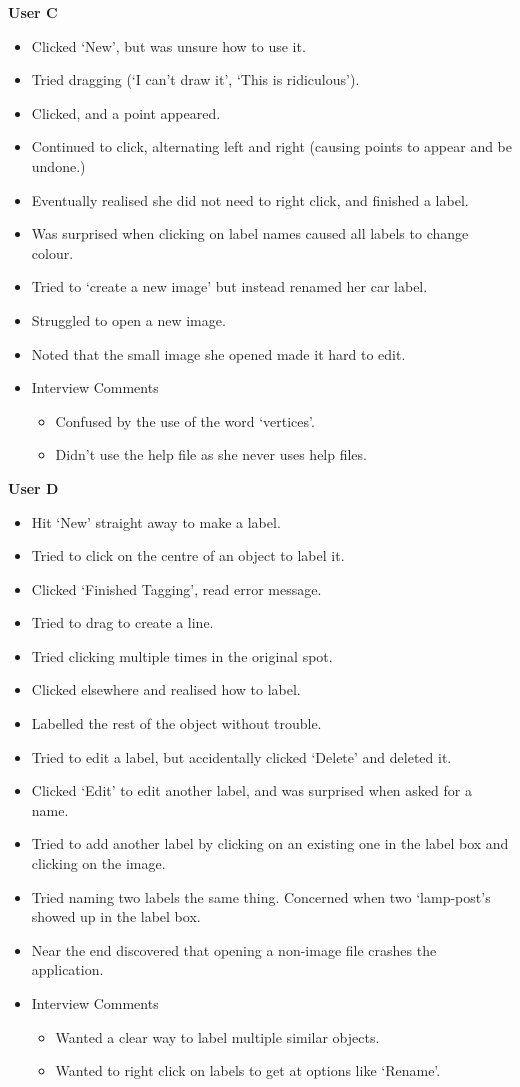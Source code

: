 \documentclass[11pt,twocolumn]{article}
\begin{document}
\textbf{User C}
\begin{itemize}
\item Clicked `New', but was unsure how to use it.
\item Tried dragging (`I can't draw it', `This is ridiculous').
\item Clicked, and a point appeared.
\item Continued to click, alternating left and right (causing points to appear and be undone.)
\item Eventually realised she did not need to right click, and finished a label.
\item Was surprised when clicking on label names caused all labels to change colour.
\item Tried to `create a new image' but instead renamed her car label.
\item Struggled to open a new image.
\item Noted that the small image she opened made it hard to edit.
\item Interview Comments
\begin{itemize}
\item Confused by the use of the word `vertices'.
\item Didn't use the help file as she never uses help files.
\end{itemize}
\end{itemize}

\textbf{User D}
\begin{itemize}
\item Hit `New' straight away to make a label.
\item Tried to click on the centre of an object to label it.
\item Clicked `Finished Tagging', read error message.
\item Tried to drag to create a line.
\item Tried clicking multiple times in the original spot.
\item Clicked elsewhere and realised how to label.
\item Labelled the rest of the object without trouble.
\item Tried to edit a label, but accidentally clicked `Delete' and deleted it.
\item Clicked `Edit' to edit another label, and was surprised when asked for a name.
\item Tried to add another label by clicking on an existing one in the label box and clicking on the image.
\item Tried naming two labels the same thing. Concerned when two `lamp-post's showed up in the label box.
\item Near the end discovered that opening a non-image file crashes the application.
\item Interview Comments
\begin{itemize}
\item Wanted a clear way to label multiple similar objects. 
\item Wanted to right click on labels to get at options like `Rename'.
\end{itemize}
\end{itemize}
\end{document}
